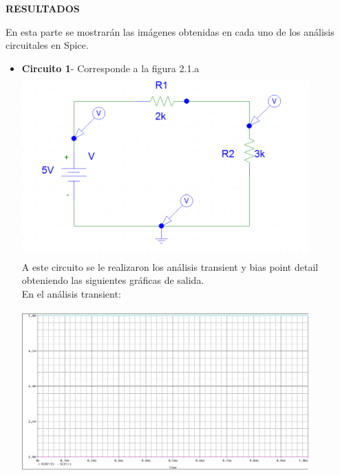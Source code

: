\documentclass[12pt]{article}
\begin{document}
	\newpage
	
	\begin{center}
		\textbf{\large RESULTADOS}\\
	\end{center}
	

	En esta parte se mostrarán las imágenes obtenidas en cada uno de los análisis circuitales en Spice.\\
	
	\begin{itemize}
		\item \textbf{Circuito 1}- Corresponde a la figura 2.1.a\\ 
		
		\includegraphics[width=11cm,height=7cm]{Img/dc_dos_resis.png}\\
		
		\noindent A este circuito se le realizaron los análisis transient y bias point detail obteniendo las siguientes gráficas de salida.\\
		
		\noindent En el análisis transient:\\
		
		\includegraphics[width=11cm,height=7cm]{Img/Fuente_DC_y_dos_resistencias.png}
		

\end{itemize}
\end{document}
